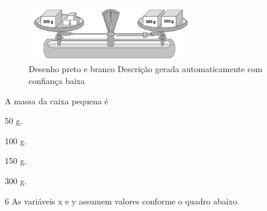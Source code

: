 \begin{escolha}
\begin{escolha}
\begin{escolha}
\begin{escolha}
{\begin{boxmedio}
\begin{boxpeq}
\begin{q°}
\begin{boxmedio}
\begin{boxpeq}
\begin{boxpeq}
\begin{boxmedio}
\begin{boxmedio}
\begin{boxmedio}
\begin{largebox}
\begin{boxmedio}
{\begin{escolha}
\begin{escolha}
\begin{escolha}
\begin{escolha}
\begin{escolha}
\begin{escolha}
\begin{figure}
\centering
\includegraphics[width=2.82812in,height=0.97757in]{./_SAEB_9_MAT/media/image263.png}
\caption{Desenho preto e branco Descrição gerada automaticamente com
confiança baixa}
\end{figure}


A massa da caixa pequena é

\begin{escolha}

  \item 50 g. 

  \item 100 g. 

  \item 150 g. 

  \item 300 g.

\end{escolha}


\num{6} As variáveis x e y assumem valores conforme o quadro abaixo.


\end{escolha}
\end{escolha}
\end{escolha}
\end{escolha}
\end{escolha}
\end{escolha}}
\end{boxmedio}
\end{largebox}
\end{boxmedio}
\end{boxmedio}
\end{boxmedio}
\end{boxpeq}
\end{boxpeq}
\end{boxmedio}
\end{q°}
\end{boxpeq}
\end{boxmedio}}
\end{escolha}
\end{escolha}
\end{escolha}
\end{escolha}
